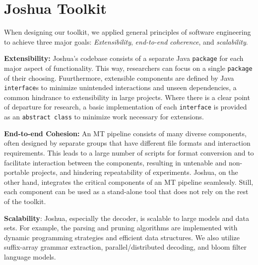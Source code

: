 \documentclass[11pt]{article}
\begin{document}


\section{Joshua Toolkit}
When designing our toolkit, we applied general principles of software engineering
to achieve three major goals: \emph{Extensibility}, \emph{end-to-end coherence},
and \emph{scalability}.

\textbf{Extensibility:} Joshua's codebase consists of a separate Java \texttt{package}
for each major aspect of functionality.  This way, researchers can focus on a single \texttt{package}
of their choosing.  Fuurthermore, extensible components are defined by Java
\texttt{interface}s to minimize unintended interactions and unseen dependencies, a common hindrance to
extensibility in large projects.  Where there is a clear point of departure for research, a basic
implementation of each \texttt{interface} is provided as an \texttt{abstract class} to minimize
work necessary for extensions.

\textbf{End-to-end Cohesion:} An MT pipeline consists of many diverse components,
often designed by separate groups that have different file formats and interaction requirements.
This leads to a large number of scripts for format conversion and to facilitate interaction
between the components, resulting in untenable
and non-portable projects, and hindering repeatability of experiments.  Joshua, on the
other hand, integrates the critical components of an MT pipeline seamlessly.
Still, each component can be used as a stand-alone tool that does not rely on the rest of the toolkit.

\textbf{Scalability}: Joshua, especially the decoder, is scalable
to large models and data sets. For example, the parsing and pruning algorithms are
implemented with dynamic programming strategies and efficient data structures. We also
utilize suffix-array grammar extraction, parallel/distributed decoding, and bloom filter
language models.
\end{document}
